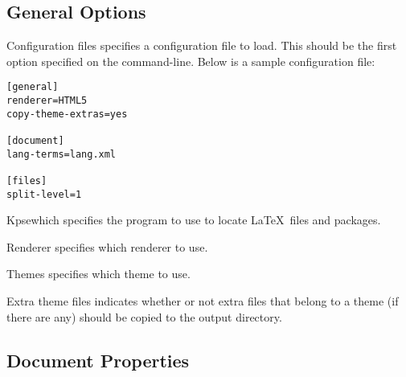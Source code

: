 \subsection{General Options}\label{sec:general-options}

\begin{configuration}{Configuration files}
specifies a configuration file to load.  This should be the first option
specified on the command-line. Below is a sample configuration file:
\begin{verbatim}
[general]
renderer=HTML5
copy-theme-extras=yes

[document]
lang-terms=lang.xml

[files]
split-level=1
\end{verbatim}
\end{configuration}

\begin{configuration}{Kpsewhich}
specifies the  program to use to locate \LaTeX\
files and packages.
\end{configuration}

\begin{configuration}{Renderer}
specifies which renderer to use.
\end{configuration}

\begin{configuration}{Themes}
specifies which theme to use.
\end{configuration}

\begin{configuration}{Extra theme files}
indicates whether or not extra files that belong to a theme (if there are
any) should be copied to the output directory.
\end{configuration}


\subsection{Document Properties\label{sec:config-document}}

